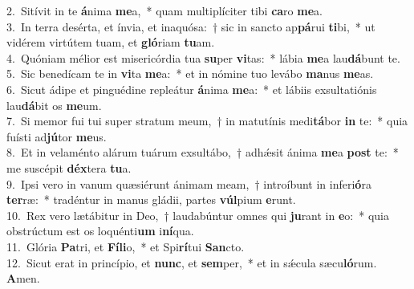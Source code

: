 {2.~}Sitívit in te \textbf{á}nima \textbf{me}a,~* quam multiplíciter tibi \textbf{ca}ro \textbf{me}a.\\
{3.~}In terra desérta, et ínvia, et inaquósa:~† sic in sancto ap\textbf{pá}rui \textbf{ti}bi,~* ut vidérem virtútem tuam, et \textbf{gló}riam \textbf{tu}am.\\
{4.~}Quóniam mélior est misericórdia tua \textbf{su}per \textbf{vi}tas:~* lábia \textbf{me}a lau\textbf{dá}bunt te.\\
{5.~}Sic benedícam te in \textbf{vi}ta \textbf{me}a:~* et in nómine tuo levábo \textbf{ma}nus \textbf{me}as.\\
{6.~}Sicut ádipe et pinguédine repleátur \textbf{á}nima \textbf{me}a:~* et lábiis exsultatiónis lau\textbf{dá}bit os \textbf{me}um.\\
{7.~}Si memor fui tui super stratum meum,~† in matutínis medi\textbf{tá}bor \textbf{in} te:~* quia fuísti ad\textbf{jú}tor \textbf{me}us.\\
{8.~}Et in velaménto alárum tuárum exsultábo,~† adhǽsit ánima \textbf{me}a \textbf{post} te:~* me suscépit \textbf{déx}tera \textbf{tu}a.\\
{9.~}Ipsi vero in vanum quæsiérunt ánimam meam,~† introíbunt in inferi\textbf{ó}ra \textbf{ter}ræ:~* tradéntur in manus gládii, partes \textbf{vúl}pium \textbf{e}runt.\\
{10.~}Rex vero lætábitur in Deo,~† laudabúntur omnes qui \textbf{ju}rant in \textbf{e}o:~* quia obstrúctum est os loquénti\textbf{um} i\textbf{ní}qua.\\
{11.~}Glória \textbf{Pa}tri, et \textbf{Fí}\textbf{li}o,~* et Spi\textbf{rí}tui \textbf{San}cto.\\
{12.~}Sicut erat in princípio, et \textbf{nunc}, et \textbf{sem}per,~* et in sǽcula sæcu\textbf{ló}rum. \textbf{A}men.\\

